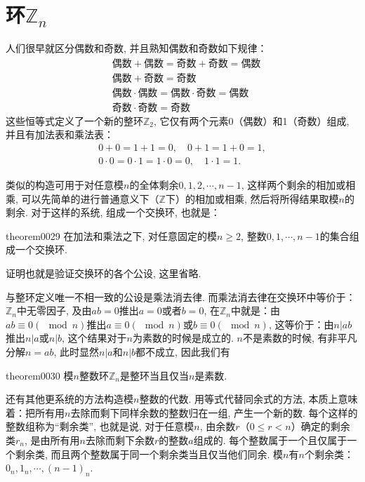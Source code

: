 \section{环$\mathbb{Z}_n$}\label{section0010110}
人们很早就区分偶数和奇数, 并且熟知偶数和奇数如下规律：
\[
\begin{aligned}
&\text{偶数}+\text{偶数} = \text{奇数} + \text{奇数} = \text{偶数}\\
&\text{偶数}+\text{奇数} = \text{奇数}\\
&\text{偶数}\cdot\text{偶数} = \text{偶数}\cdot\text{奇数} = \text{偶数}\\
&\text{奇数} \cdot \text{奇数} = \text{奇数}
\end{aligned}
\]
这些恒等式定义了一个新的整环$\mathbb{Z}_2$, 它仅有两个元素0（偶数）和1（奇数）组成, 并且有加法表和乘法表：
\begin{gather*}
0+0=1+1=0, \quad 0+1=1+0=1,\\
0 \cdot 0=0 \cdot 1= 1 \cdot 0 =0,\quad 1 \cdot 1 = 1.
\end{gather*}

类似的构造可用于对任意模$n$的全体剩余$0,1,2,\cdots,n-1$, 这样两个剩余的相加或相乘, 可以先简单的进行普通意义下（$\mathbb{Z}$下）的相加或相乘, 然后将所得结果取模$n$的剩余. 对于这样的系统, 组成一个交换环, 也就是：
\begin{theorem}{}{theorem0029}
在加法和乘法之下, 对任意固定的模$n \ge 2$, 整数$0, 1, \cdots, n-1$的集合组成一个交换环. 
\end{theorem}

证明也就是验证交换环的各个公设, 这里省略. 

与整环定义唯一不相一致的公设是乘法消去律. 而乘法消去律在交换环中等价于：$\mathbb{Z}_n$中无零因子, 及由$ab=0$推出$a=0$或者$b=0$, 在$\mathbb{Z}_n$中就是：由$ab \equiv 0(\mod{n})$推出$a \equiv 0(\mod{n})$或$b \equiv 0(\mod{n})$, 这等价于：由$n|ab$推出$n|a$或$n|b$, 这个结果对于$n$为素数的时候是成立的. $n$不是素数的时候, 有非平凡分解$n=ab$, 此时显然$n|a$和$n|b$都不成立, 因此我们有
\begin{theorem}{}{theorem0030}
模$n$整数环$\mathbb{Z}_n$是整环当且仅当$n$是素数. 
\end{theorem}

还有其他更系统的方法构造模$n$整数的代数. 用等式代替同余式的方法, 本质上意味着：把所有用$n$去除而剩下同样余数的整数归在一组, 产生一个新的数. 每个这样的整数组称为“剩余类”, 也就是说, 对于任意模$n$, 由余数$r$（$0 \le r < n$）确定的剩余类$r_n$, 是由所有用$n$去除而剩下余数$r$的整数$a$组成的. 每个整数属于一个且仅属于一个剩余类, 而且两个整数属于同一个剩余类当且仅当他们同余. 模$n$有$n$个剩余类：$0_n,1_n,\cdots,(n-1)_n$. 

